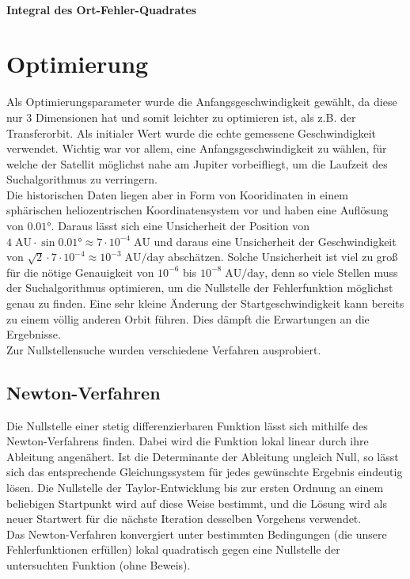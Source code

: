\paragraph{Integral des Ort-Fehler-Quadrates}

\section{Optimierung}
Als Optimierungsparameter wurde die Anfangsgeschwindigkeit gewählt, da diese nur 3 Dimensionen hat und somit leichter zu optimieren ist, als z.B. der Transferorbit.
Als initialer Wert wurde die echte gemessene Geschwindigkeit verwendet. Wichtig war vor allem, eine Anfangsgeschwindigkeit zu wählen, für welche der Satellit möglichst nahe am Jupiter vorbeifliegt, um die Laufzeit des Suchalgorithmus zu verringern. \\
Die historischen Daten liegen aber in Form von Kooridinaten in einem sphärischen heliozentrischen Koordinatensystem vor und haben eine Auflösung von $0.01\text{°}$.
Daraus lässt sich eine Unsicherheit der Position von $4\;\text{AU}\cdot\sin 0.01\text{°}\approx 7\cdot 10^{-4}\;\text{AU}$ und daraus eine Unsicherheit der Geschwindigkeit von $\sqrt{2}\cdot 7\cdot 10^{-4} \approx 10^{-3}\;\text{AU/day}$ abschätzen.
Solche Unsicherheit ist viel zu groß für die nötige Genauigkeit von $10^{-6}$ bis $10^{-8}\;\text{AU/day}$, denn so viele Stellen muss der Suchalgorithmus optimieren, um die Nullstelle der Fehlerfunktion möglichst genau zu finden. Eine sehr kleine Änderung der Startgeschwindigkeit kann bereits zu einem völlig anderen Orbit führen. Dies dämpft die Erwartungen an die Ergebnisse.\\
Zur Nullstellensuche wurden verschiedene Verfahren ausprobiert.

\subsection{Newton-Verfahren}

Die Nullstelle einer stetig differenzierbaren Funktion lässt sich mithilfe des Newton-Verfahrens finden. Dabei wird die Funktion lokal linear durch ihre Ableitung angenähert. Ist die Determinante der Ableitung ungleich Null, so lässt sich das entsprechende Gleichungssystem für jedes gewünschte Ergebnis eindeutig lösen. Die Nullstelle der Taylor-Entwicklung bis zur ersten Ordnung an einem beliebigen Startpunkt wird auf diese Weise bestimmt, und die Lösung wird als neuer Startwert für die nächste Iteration desselben Vorgehens verwendet. \\
Das Newton-Verfahren konvergiert unter bestimmten Bedingungen (die unsere Fehlerfunktionen erfüllen) lokal quadratisch gegen eine Nullstelle der untersuchten Funktion (ohne Beweis).

